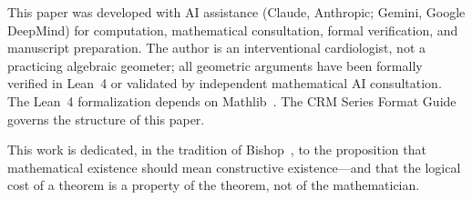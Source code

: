 \documentclass[11pt]{article}
\theoremstyle{plain}
\theoremstyle{definition}
\theoremstyle{remark}
\begin{document}
This paper was developed with AI assistance (Claude, Anthropic; Gemini,
Google DeepMind) for computation, mathematical consultation, formal
verification, and manuscript preparation.  The author is an interventional
cardiologist, not a practicing algebraic geometer; all geometric arguments
have been formally verified in Lean~4 or validated by independent
mathematical AI consultation.  The Lean~4 formalization depends on
Mathlib~\cite{mathlib4}.  The CRM Series Format
Guide~\cite{crm-format-guide} governs the structure of this paper.

This work is dedicated, in the tradition of Bishop~\cite{bishop1967},
to the proposition that mathematical existence should mean constructive
existence---and that the logical cost of a theorem is a property of the
theorem, not of the mathematician.
\end{document}

